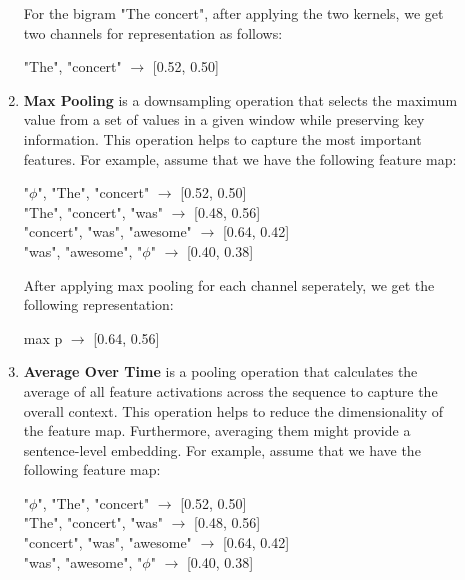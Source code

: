 \documentclass[10pt]{article}
\begin{document}
\begin{description}
\begin{enumerate}
        For the bigram "The concert", after applying the two kernels, we get two channels for representation as follows:

        \begin{center}
            "The", "concert" $\rightarrow$ [0.52, 0.50] \\
        \end{center}

        \item \textbf{Max Pooling} is a downsampling operation that selects the maximum value from a set of values in a given window while preserving key information.
        This operation helps to capture the most important features. For example, assume that we have the following feature map:

        \begin{center}
            "$\phi$", "The", "concert" $\rightarrow$ [0.52, 0.50] \\
            "The", "concert", "was" $\rightarrow$ [0.48, 0.56] \\
            "concert", "was", "awesome" $\rightarrow$ [0.64, 0.42] \\
            "was", "awesome", "$\phi$" $\rightarrow$ [0.40, 0.38]
        \end{center}

        After applying max pooling for each channel seperately, we get the following representation:

        \begin{center}
            max p $\rightarrow$ [0.64, 0.56] \\
        \end{center}

        \item \textbf{Average Over Time} is a pooling operation that calculates the average of all feature activations across the sequence to capture the overall context.
        This operation helps to reduce the dimensionality of the feature map. Furthermore, averaging them might provide a sentence-level embedding.
        For example, assume that we have the following feature map:

        \begin{center}
            "$\phi$", "The", "concert" $\rightarrow$ [0.52, 0.50] \\
            "The", "concert", "was" $\rightarrow$ [0.48, 0.56] \\
            "concert", "was", "awesome" $\rightarrow$ [0.64, 0.42] \\
            "was", "awesome", "$\phi$" $\rightarrow$ [0.40, 0.38]
        \end{center}


\end{enumerate}
\end{description}
\end{document}
